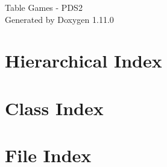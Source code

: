 \documentclass[twoside]{book}
\newcommand{\+}{\discretionary{\mbox{\scriptsize$\hookleftarrow$}}{}{}}
\newcommand{\clearemptydoublepage}{%
    \newpage{\pagestyle{empty}\cleardoublepage}%
  }
\begin{document}
  \raggedbottom
    \hypersetup{pageanchor=false,
                bookmarksnumbered=true,
                pdfencoding=unicode
               }
  \begin{titlepage}
  \vspace*{7cm}
  \begin{center}%
  {\Large Table Games -\/ PDS2}\\
  \vspace*{1cm}
  {\large Generated by Doxygen 1.11.0}\\
  \end{center}
  \end{titlepage}
  \clearemptydoublepage
  \tableofcontents
  \clearemptydoublepage
  \hypersetup{pageanchor=true}
\chapter{Hierarchical Index}

\chapter{Class Index}

\chapter{File Index}

\end{document}
